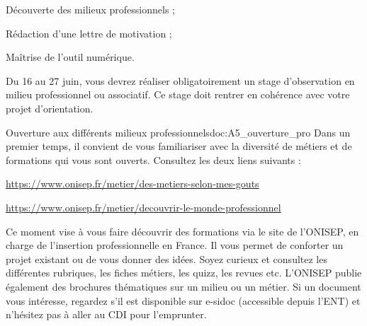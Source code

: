 \teteSndAP


\begin{objectifs}
  \item Découverte des milieux professionnels ;
  \item Rédaction d’une lettre de motivation ;
  \item Maîtrise de l’outil numérique.
\end{objectifs}
\medskip

\begin{contexte}
  Du 16 au 27 juin, vous devrez réaliser obligatoirement un stage d’observation en milieu professionnel ou associatif. Ce stage doit rentrer en cohérence avec votre projet d’orientation.
\end{contexte}
\medskip

\begin{doc}{Ouverture aux différents milieux professionnels}{doc:A5_ouverture_pro}
  Dans un premier temps, il convient de vous familiariser avec la diversité de métiers et de formations qui vous sont ouverts.
  Consultez les deux liens suivants :
  \begin{listePoints}
    \item \url{https://www.onisep.fr/metier/des-metiers-selon-mes-gouts} 
    \item \url{https://www.onisep.fr/metier/decouvrir-le-monde-professionnel}
  \end{listePoints}
  Ce moment vise à vous faire découvrir des formations via le site de l’ONISEP, en charge de l’insertion professionnelle en France. Il vous permet de conforter un projet existant ou de vous donner des idées.
  Soyez curieux et consultez les différentes rubriques, les fiches métiers, les quizz, les revues etc.
  L’ONISEP publie également des brochures thématiques sur un milieu ou un métier. Si un document vous intéresse, regardez s’il est disponible sur e-sidoc (accessible depuis l’ENT) et n’hésitez pas à aller au CDI pour l’emprunter. 
\end{doc}

